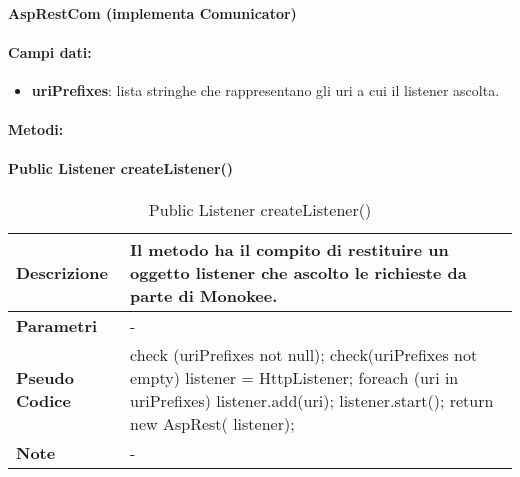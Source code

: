 \paragraph{AspRestCom (implementa Comunicator)}
\paragraph{Campi dati:}
\begin{itemize}
    \item \textbf{uriPrefixes}: lista stringhe che rappresentano gli uri a cui il listener ascolta. 
\end{itemize}

\paragraph{Metodi:}
\paragraph{Public Listener createListener()}
\begin{center}
    \begin{longtable}{|p{3cm}|p{9cm}|}%
    \caption{Public Listener createListener()}
    \label{tab:public-listner-createListener}
    \endfirsthead
    \endhead
    \hline
    \textbf{Descrizione} & Il metodo ha il compito di restituire un oggetto listener che ascolto le richieste da parte di Monokee.  \\
    \hline
    \textbf{Parametri} &      
        -
    \\
    \hline
    \textbf{Pseudo Codice} & 
        check (uriPrefixes not null); \newline
        check(uriPrefixes not empty) \newline
        listener = HttpListener; \newline
        foreach (uri in uriPrefixes) {
            listener.add(uri); \newline
        }
        listener.start(); \newline
        return new AspRest( listener); \newline
    \\
    \hline
    \textbf{Note} & - \\
    \hline
    \end{longtable}
    \end{center}

